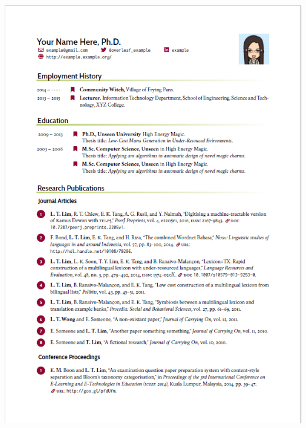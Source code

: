 \documentclass[
  letterpaper,
]{scrbook}
\begin{document}
{{{\protect\includegraphics{images/CVtemp.png}
}}}
\end{document}
